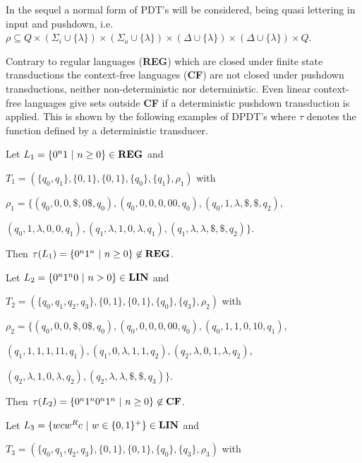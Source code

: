 \documentclass{eptcs}
\begin{document}
In the sequel a normal form of PDT's will be considered, being quasi lettering
in input and pushdown, i.e.
$\rho\subseteq Q\times(\Sigma_i\cup\{\lambda\})\times(\Sigma_o\cup\{\lambda\})
\times(\Delta\cup\{\lambda\})\times(\Delta\cup\{\lambda\})\times Q$.

\bigskip

Contrary to regular languages ({\bf REG}) which are closed under finite state
transductions the context-free languages ({\bf CF})
are not closed under pushdown transductions, neither non-deterministic nor
deterministic. Even linear context-free languages give sets outside {\bf CF}
if a deterministic pushdown transduction is applied. This is shown by the
following examples of DPDT's where $\tau$ denotes the function
defined by a deterministic transducer.

\medskip

\noindent
Let $L_1 = \{0^n1\ |\ n\geq 0\}\in {\bf REG}$ and

$T_1=(\{q_0,q_1\},\{0,1\},\{0,1\},\{q_0\},\{q_1\},\rho_1)$
with

$\rho_1 = \{(q_0,0,0,{\$},0{\$},q_0),(q_0,0,0,0,00,q_0),
(q_0,1,\lambda,{\$},{\$},q_2),$

\hspace{1cm}$(q_0,1,\lambda,0,0,q_1),
(q_1,\lambda,1,0,\lambda,q_1),(q_1,\lambda,\lambda,{\$},{\$},q_2)\}$.

Then $\tau(L_1) = \{0^n1^n\ |\ n\geq 0\} \not\in {\bf REG}$.

\medskip

\noindent
Let $L_2 = \{0^n1^n0\ |\ n>0\}\in {\bf LIN}$ and

$T_2=(\{q_0,q_1,q_2,q_3\},\{0,1\},\{0,1\},\{q_0\},\{q_3\},\rho_2)$
with

$\rho_2=\{(q_0,0,0,{\$},0{\$},q_0),(q_0,0,0,0,00,q_0),
(q_0,1,1,0,10,q_1),$

\hspace{1cm}$(q_1,1,1,1,11,q_1),
(q_1,0,\lambda,1,1,q_2),(q_2,\lambda,0,1,\lambda,q_2),$

\hspace{1cm}$(q_2,\lambda,1,0,\lambda,q_2),
(q_2,\lambda,\lambda,{\$},{\$},q_3)\}$.

Then $\tau(L_2) = \{0^n1^n0^n1^n\ |\ n\geq 0\} \not\in {\bf CF}$.

\medskip

\noindent
Let $L_3 = \{wcw^Rc\ |\ w\in\{0,1\}^+\}\in {\bf LIN}$ and

$T_3=(\{q_0,q_1,q_2,q_3\},\{0,1\},\{0,1\},\{q_0\},\{q_3\},\rho_3)$
with
\end{document}
